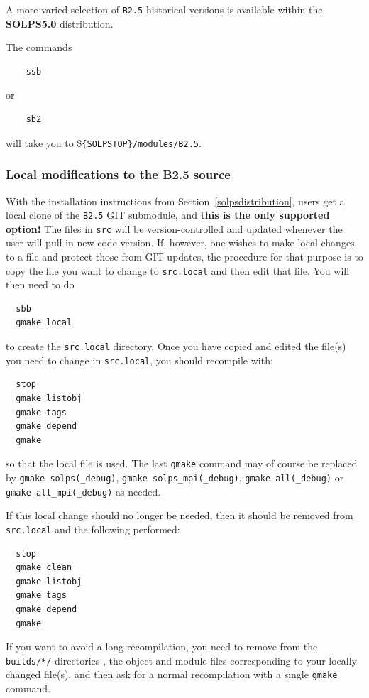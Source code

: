 \documentclass[a4paper,10pt]{report}
\begin{document}
A more varied selection of {\tt B2.5} historical versions is available within the {\bf SOLPS5.0} distribution.

The commands
\begin{verbatim}
    ssb
\end{verbatim}
or
\begin{verbatim}
    sb2
\end{verbatim}
will take you to \${\tt \{SOLPSTOP\}/modules/B2.5}.

\subsubsection{Local modifications to the B2.5 source}
\label{b2codemodifications}

With the installation instructions from Section~\ref{solpsdistribution},
users get a local clone of the {\tt B2.5} GIT submodule, and
{\bf this is the only supported option!}
The files in {\tt src} will be version-controlled and updated whenever the
user will pull in new code version.
If, however, one wishes to make local changes to a file and protect those from
GIT updates, the procedure for that purpose is to copy the file you want to change to
{\tt src.local} and then edit that file.  You will then need to do
\begin{verbatim}
  sbb
  gmake local
\end{verbatim}
to create the {\tt src.local} directory. Once you have copied and edited the
file(s) you need to change in {\tt src.local}, you should recompile with:
\begin{verbatim}
  stop
  gmake listobj
  gmake tags
  gmake depend
  gmake
\end{verbatim}
so that the local file is used. The last {\tt gmake} command may of course be
replaced by {\tt gmake solps(\_debug)}, {\tt gmake solps\_mpi(\_debug)},
{\tt gmake all(\_debug)} or {\tt gmake all\_mpi(\_debug)} as needed.

If this local change should no longer
be needed, then it should be removed from {\tt src.local} and the
following performed:
\begin{verbatim}
  stop
  gmake clean
  gmake listobj
  gmake tags
  gmake depend
  gmake
\end{verbatim}
If you want to avoid a long recompilation, you need to remove from the {\tt builds/*/}
directories , the object and module files corresponding to your locally changed file(s),
and then ask for a normal recompilation with a single {\tt gmake} command.
\end{document}
